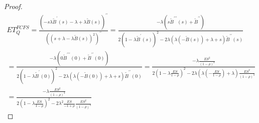 \begin{proof}
\begin{gather*}
    ET_{Q}^{FCFS}
    = \frac{\left(-s \lambda \widetilde{B}^{\prime}(s) - \lambda + \lambda \widetilde{B} (s)\right)^{\prime\prime}}{\left((s + \lambda - \lambda \widetilde{B}(s))^2\right)^{\prime\prime}}
    = \frac{-\lambda (s \widetilde{B}^{\prime\prime\prime}(s) + \widetilde{B}^{\prime\prime})}{2(1 - \lambda \widetilde{B}^{\prime}(s))^2 - 2\lambda(\lambda(-\widetilde{B}(s)) + \lambda + s)\widetilde{B}^{\prime\prime}(s)}\\
    = \frac{-\lambda (0 \widetilde{B}^{\prime\prime\prime}(0) + \widetilde{B}^{\prime\prime}(0))}{2(1 - \lambda \widetilde{B}^{\prime}(0))^2 - 2\lambda(\lambda(-\widetilde{B}(0)) + \lambda + s)\widetilde{B}^{\prime\prime}(0)}
    = \frac{-\lambda \frac{ES^2}{(1 - \rho)^3}}{2(1 - \lambda \frac{ES}{1 - \rho})^2 - 2 \lambda (\lambda (-\frac{ES}{1 - \rho}) + \lambda) \frac{ES^2}{(1 - \rho)^3}}\\
    = \frac{-\lambda \frac{ES^2}{(1 - \rho)^3}}{2(1 - \lambda \frac{ES}{1 - \rho})^2 - 2 \lambda^2 \frac{ES}{-1 + \rho} \frac{ES^2}{(1 - \rho)^3}}
\end{gather*}
\end{proof}